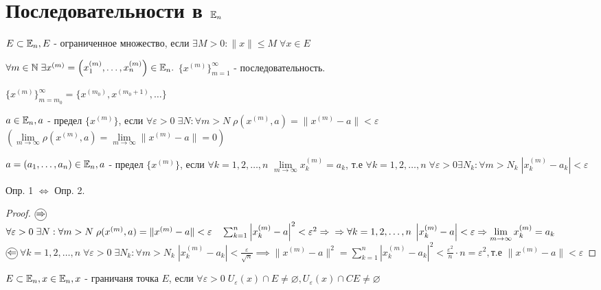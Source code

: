 \documentclass[../main.tex]{subfiles}
\begin{document}
\section{Последовательности в $\mathbb{E}_{n}$}
\begin{definition}
    $E\subset \mathbb{E}_{n}, E $ - ограниченное множество, если $\exists M > 0 : \| x\| \leqslant M \;\forall x \in E$
\end{definition}


\begin{definition} 
    $\forall m \in \mathbb{N} \; \exists x^{(m)}=\left(x_{1}^{(m)},\dots,x_{n}^{(m)}\right)\in \mathbb{E}_{n}.$ $\{x^{(m)}\}_{m=1}^{\infty}$ - последовательность.
\end{definition}
$\{x^{(m)}\}_{m=m_{0}}^{\infty}=\{x^{(m_{0})},x^{(m_{0}+1)},\dots\}$
\begin{definition}
    $a \in \mathbb{E}_{n}, a$ - предел $\{x^{(m)}\}$, если $\forall \varepsilon>0 \; \exists  N: \forall m>N \; \rho(x^{(m)},a)=\|x^{(m)}-a\|<\varepsilon$ $\left(\lim\limits_{m \to \infty}\rho(x^{(m)},a) = \lim\limits_{m \to \infty}\|x^{(m)}-a\| = 0 \right)$
\end{definition}
\begin{definition}
    $a=(a_{1},\dots,a_{n})\in \mathbb{E}_{n}, a$ - предел $\{x^{(m)}\}$, если $\forall k = 1,2,\dots,n$ \; $\lim\limits_{m    \to \infty}x_{k}^{(m)}=a_{k}$, т.е $\forall k =1,2,\dots,n\;\forall \varepsilon>0 \exists N_{k}: \forall m> N_{k}\; |x^{(m)}_{k}-a_{k}| < \varepsilon $
\end{definition}
\begin{theorem}
    Опр. 1 $\Leftrightarrow$ Опр. 2. 
\end{theorem}
\begin{proof}
    $\tcircle{$\implies$}$ $\forall \varepsilon>0 \;\exists N : \forall m> N \; \rho(x^{(m)},a)= \| x^{(m)}-a\| <\varepsilon\quad \sum_{k=1}^{n } \left| x_{k}^{(m)}-a\right|^{2}<\varepsilon^{2}\implies\\\implies \forall k=1,2,\dots,n \; \left|x_{k}^{(m)}-a\right| <\varepsilon \implies \lim\limits_{m  \to \infty}x_{k}^{(m)}=a_{k} $
    \\$\tcircle{$\impliedby$}$ $\forall k=1,2,\dots,n \; \forall \varepsilon>0 \; \exists N_{k}: \forall m>N_{k} \; \left|x_{k}^{(m)}-a_{k}\right|<\frac{\varepsilon}{\sqrt{n}}\implies \| x^{(m)}-a\| ^{2} = \sum_{k=1}^{n } \left|x_{k}^{(m)}-a_{k}\right|^{2} < \frac{\varepsilon^{2}}{n}\cdot n = \varepsilon^{2},$т.е $\|x^{(m)}-a\|<\varepsilon$
\end{proof}
\begin{definition}
    $E\subset \mathbb{E}_{n}, x\in \mathbb{E}_{n}, x $ - граничаня точка $E$, если $\forall \varepsilon>0 \; U_{\varepsilon}(x)\cap E \neq  \varnothing, U_{\varepsilon}(x)\cap CE \neq  \varnothing$
\end{definition}
\end{document}
